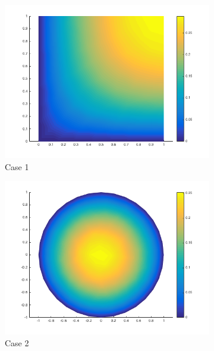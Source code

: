 \documentclass[10pt]{article}
\begin{document}
\begin{figure}[H]
        \centering
        \begin{subfigure}[b]{0.35\textwidth}
                \centering
                \includegraphics[width=\textwidth]{case1.png}
                \caption{Case 1}
        \end{subfigure}%
        \begin{subfigure}[b]{0.35\textwidth}
                \centering
                \includegraphics[width=\textwidth]{case2.png}
                \caption{Case 2}
        \end{subfigure}%
        \begin{subfigure}[b]{0.35\textwidth}
                \centering

\end{subfigure}
\end{figure}
\end{document}
